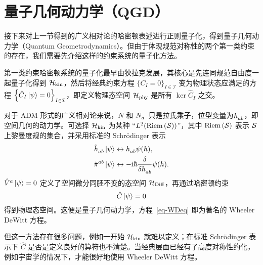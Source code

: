 	\section{量子几何动力学（QGD）}\label{section-QGD}

		接下来对上一节得到的广义相对论的哈密顿表述进行正则量子化，得到量子几何动力学（Quantum Geometrodynamics）。但由于体现规范对称性的两个第一类约束的存在，我们需要先介绍这样的约束系统的量子化方法。
	
		第一类约束哈密顿系统的量子化最早由狄拉克发展\cite{dirac2001lectures}，其核心是先连同规范自由度一起量子化得到 $\mathcal{H}_{\text{kin}}$，然后将经典约束方程 $\{ C_I = 0 \}_{I \in \mathcal{I}}$ 变为物理状态应满足的方程 $\left\{ \hat{C}_I \ket{\psi} = 0 \right\}_{I \in \mathcal{I}}$，即定义物理态空间 $\mathcal{H}_{\text{phy}}$ 是所有 $\ker \hat{C}_I$ 之交。
	
		对于 ADM 形式的广义相对论来说，$N$ 和 $\tensor{N}{_a}$ 只是拉氏乘子，位型变量为$\tensor{h}{_a_b}$，即空间几何的动力学。可选择 $\mathcal{H}_{\text{kin}}$ 为某种 “$L^2(\mathrm{Riem}\left( \mathcal{S} \right))$”，其中 $\mathrm{Riem}\left( \mathcal{S} \right)$ 表示 $\mathcal{S}$ 上黎曼度规的集合，并采用标准的 Schr\"odinger 表示
		\begin{equation}
			\begin{split}
				\tensor{\hat{h}}{_a_b} \ket{\psi} &\leftrightarrow \tensor{h}{_a_b} \psi(h),\\
				\tensor{\hat{\pi}}{^a^b} \ket{\psi} & \leftrightarrow - \ii \uphbar \fdv{\tensor{h}{_a_b}} \psi(h).
			\end{split}
		\end{equation}
		$\tensor{\hat{V}}{^a} \ket{\psi} =0$ 定义了空间微分同胚不变的态空间 $\mathcal{H}_{\text{Diff}}$，再通过哈密顿约束
		\begin{equation}
			\hat{C} \ket{\psi} =0 \label{eq-WDeq}
		\end{equation}
		得到物理态空间。这便是量子几何动力学，方程~\eqref{eq-WDeq} 即为著名的 Wheeler DeWitt 方程。
	
		但这一方法存在很多问题，例如一开始 $\mathcal{H}_{\text{kin}}$ 就难以定义；在标准 Schr\"o\-dinger 表示下 $\hat{C}$ 是否是定义良好的算符也不清楚。当经典层面已经有了高度对称性约化，例如宇宙学的情况下，才能很好地使用 Wheeler DeWitt 方程。
		
		
